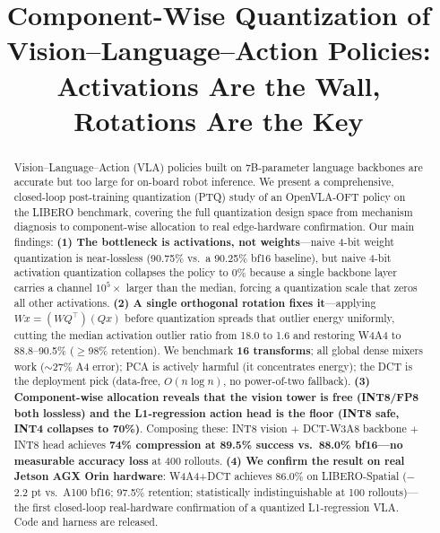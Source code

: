 \documentclass[conference]{IEEEtran}
\begin{document}
\title{Component-Wise Quantization of Vision--Language--Action Policies:\\
Activations Are the Wall, Rotations Are the Key}

\author{
}

\maketitle

\begin{abstract}
Vision--Language--Action (VLA) policies built on 7B-parameter language backbones are accurate
but too large for on-board robot inference. We present a comprehensive, closed-loop
post-training quantization (PTQ) study of an OpenVLA-OFT policy on the LIBERO benchmark,
covering the full quantization design space from mechanism diagnosis to component-wise
allocation to real edge-hardware confirmation. Our main findings: \textbf{(1) The bottleneck
is activations, not weights}---naive 4-bit weight quantization is near-lossless (90.75\% vs.\
a 90.25\% bf16 baseline), but naive 4-bit activation quantization collapses the policy to 0\%
because a single backbone layer carries a channel $10^5\times$ larger than the median, forcing a
quantization scale that zeros all other activations. \textbf{(2) A single orthogonal rotation
fixes it}---applying $Wx=(WQ^\top)(Qx)$ before quantization spreads that outlier energy
uniformly, cutting the median activation outlier ratio from 18.0 to 1.6 and restoring W4A4
to 88.8--90.5\% ($\geq$98\% retention). We benchmark \textbf{16 transforms}; all global
dense mixers work ($\sim$27\% A4 error); PCA is actively harmful (it concentrates energy);
the DCT is the deployment pick (data-free, $O(n\log n)$, no power-of-two fallback).
\textbf{(3) Component-wise allocation reveals that the vision tower is free (INT8/FP8 both
lossless) and the L1-regression action head is the floor (INT8 safe, INT4 collapses to 70\%)}.
Composing these: INT8 vision $+$ DCT-W3A8 backbone $+$ INT8 head achieves
\textbf{74\% compression at 89.5\% success vs.\ 88.0\% bf16---no measurable accuracy loss} at
400 rollouts. \textbf{(4) We confirm the result on real Jetson AGX Orin hardware}: W4A4+DCT
achieves 86.0\% on LIBERO-Spatial ($-$2.2 pt vs.\ A100 bf16; 97.5\% retention;
statistically indistinguishable at 100 rollouts)---the first closed-loop real-hardware
confirmation of a quantized L1-regression VLA. Code and harness are released.
\end{abstract}
\end{document}
